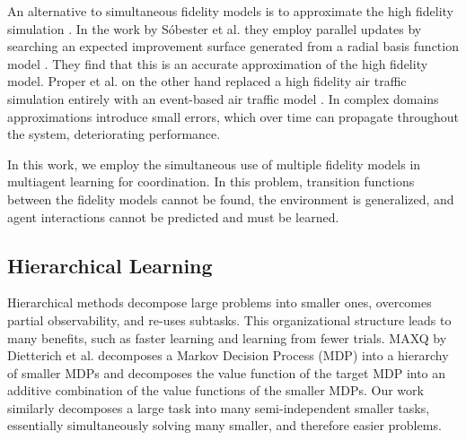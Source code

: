 \documentclass{sig-alternate}
\begin{document}

An alternative to simultaneous fidelity models is to approximate the high fidelity simulation \cite{ Proper:2012:MDR:2343896.2344025,eps23053}. In the work by S{\'o}bester et al. they employ parallel updates by searching an expected improvement surface generated from a radial basis function model \cite{eps23053}. They find that this is an accurate approximation of the high fidelity model. Proper et al. on the other hand replaced a high fidelity air traffic simulation entirely with an event-based air traffic model \cite{Proper:2012:MDR:2343896.2344025}. In complex domains approximations introduce small errors, which over time can propagate throughout the system, deteriorating performance.
  
In this work, we employ the simultaneous use of multiple fidelity models in multiagent learning for coordination. In this problem, transition functions between the fidelity models cannot be found, the environment is generalized, and agent interactions cannot be predicted and must be learned.

\subsection{Hierarchical Learning}

Hierarchical methods decompose large problems into smaller ones, overcomes partial observability, and re-uses subtasks. This organizational structure leads to many benefits, such as faster learning and learning from fewer trials. MAXQ by Dietterich et al. \cite{Dietterich00hierarchicalreinforcement} decomposes a Markov Decision Process (MDP) into a hierarchy of smaller MDPs and decomposes the value function of the target MDP into an additive combination of the value functions of the smaller MDPs. Our work similarly decomposes a large task into many semi-independent smaller tasks, essentially simultaneously solving many smaller, and therefore easier problems.
\end{document}
